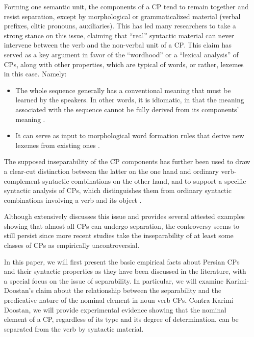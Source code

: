 \documentclass[output=paper]{langsci/langscibook}
\begin{document}
Forming one semantic unit, the components of a CP tend to remain together and resist separation, except by morphological or grammaticalized material (verbal prefixes, clitic pronouns, auxiliaries). This has led many researchers to take a strong stance on this issue, claiming that “real” syntactic material can never intervene between the verb and the non-verbal unit of a CP. This claim has served as a key argument in favor of the ``wordhood'' \citep[][134--135]{Goldberg1996} or a ``lexical analysis'' \citep{dabir1997compound,Karimi-Doostan1997} of CPs, along with other properties, which are typical of words, or rather, lexemes in this case. Namely:

\begin{itemize}
	\item The whole sequence generally has a conventional meaning that must be learned by the speakers. In other words, it is idiomatic, in that the meaning associated with the sequence cannot be fully derived from its components' meaning \citep{Goldberg1996,Karimi-Doostan1997,Samvelian2001,Samvelian2012,SamFag2013}. 
	\item
          \begin{sloppypar}
            It can serve as input to morphological word formation
            rules that derive new lexemes from existing ones
            \citep{Goldberg1996,Karimi-Doostan1997,Megerdoomian2002,Vahedi-Langrudi:1996}.
          \end{sloppypar}
\end{itemize}

The supposed inseparability of the CP components has further been used to draw a clear-cut distinction between the latter on the one hand and ordinary verb-complement syntactic combinations on the other hand, and to support a specific syntactic analysis of CPs, which distinguishes them from ordinary syntactic combinations involving a verb and its object \citep[with the notable exception of][]{Muller2010,Samvelian2001,Samvelian2012,SamFag2014,SamFagBLS}.

Although \citet[][55--87]{Samvelian2012} extensively discusses this issue and provides several attested examples showing that almost all CPs can undergo separation, the controversy seems to still persist since more recent studies \citep[e.g.][]{SafaviEtal2016} take the inseparability of at least some classes of CPs as empirically uncontroversial.


In this paper, we will first present the basic empirical facts about Persian CPs and their syntactic properties as they have been discussed in the literature, with a special focus on the issue of separability. In particular, we will examine Karimi-Doostan's claim about the relationship between the separability and the predicative nature of the nominal element in noun-verb CPs. Contra Karimi-Doostan, we will provide experimental evidence showing that the nominal element of a CP, regardless of its type and its degree of determination, can be separated from the verb by syntactic material. 
\end{document}
